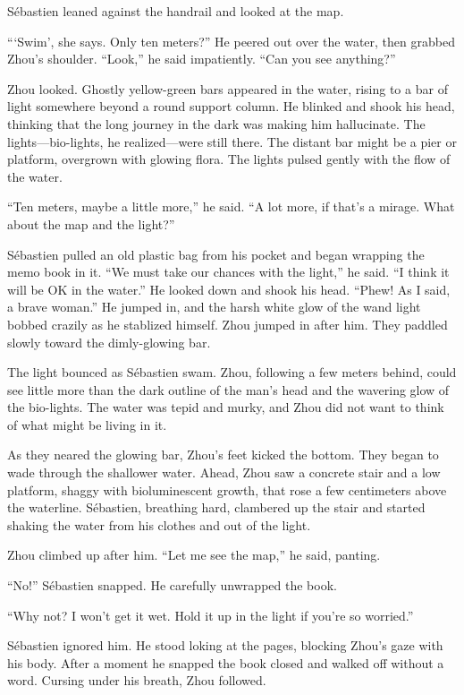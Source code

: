 \documentclass[10pt,b5paper]{article}
\begin{document}
S\'{e}bastien leaned against the handrail and looked at the map.

```Swim', she says. Only ten meters?'' He peered out over the
water, then grabbed Zhou's shoulder. ``Look,'' he said impatiently.
``Can you see anything?''

Zhou looked. Ghostly yellow-green bars appeared in the water,
rising to a bar of light somewhere beyond a round support column.
He blinked and shook his head, thinking that the long journey in
the dark was making him hallucinate. The lights---bio-lights, he
realized---were still there. The distant bar might be a pier or
platform, overgrown with glowing flora. The lights pulsed gently
with the flow of the water.

``Ten meters, maybe a little more,'' he said. ``A lot more, if that's
a mirage. What about the map and the light?''

S\'{e}bastien pulled an old plastic bag from his pocket and began
wrapping the memo book in it. ``We must take our chances with the
light,'' he said. ``I think it will be OK in the water.'' He looked
down and shook his head. ``Phew! As I said, a brave woman.'' He jumped
in, and the harsh white glow of the wand light bobbed crazily as he
stablized himself. Zhou jumped in after him. They paddled slowly
toward the dimly-glowing bar.

The light bounced as S\'{e}bastien swam. Zhou, following a few meters
behind, could see little more than the dark outline of the man's
head and the wavering glow of the bio-lights. The water was tepid and
murky, and Zhou did not want to think of what might be living in it.

As they neared the glowing bar, Zhou's feet kicked the bottom.
They began to wade through the shallower water. Ahead, Zhou saw
a concrete stair and a low platform, shaggy with bioluminescent
growth, that rose a few centimeters above the waterline. S\'{e}bastien,
breathing hard, clambered up the stair and started shaking the
water from his clothes and out of the light.

Zhou climbed up after him. ``Let me see the map,'' he said, panting.

``No!'' S\'{e}bastien snapped. He carefully unwrapped the book.

``Why not? I won't get it wet. Hold it up in the light if you're
so worried.''

S\'{e}bastien ignored him. He stood loking at the pages, blocking Zhou's
gaze with his body. After a moment he snapped the book closed and
walked off without a word. Cursing under his breath, Zhou followed.
\end{document}
